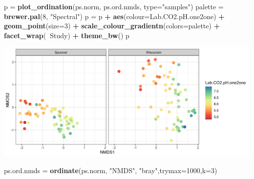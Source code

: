 \documentclass[]{article}
\newenvironment{Shaded}{\begin{snugshade}}{\end{snugshade}}
\newcommand{\DataTypeTok}[1]{\textcolor[rgb]{0.13,0.29,0.53}{#1}}
\newcommand{\DecValTok}[1]{\textcolor[rgb]{0.00,0.00,0.81}{#1}}
\newcommand{\KeywordTok}[1]{\textcolor[rgb]{0.13,0.29,0.53}{\textbf{#1}}}
\newcommand{\NormalTok}[1]{#1}
\newcommand{\OperatorTok}[1]{\textcolor[rgb]{0.81,0.36,0.00}{\textbf{#1}}}
\newcommand{\StringTok}[1]{\textcolor[rgb]{0.31,0.60,0.02}{#1}}
\begin{document}
\begin{Shaded}
\begin{Highlighting}[]
\NormalTok{p =}\StringTok{ }\KeywordTok{plot_ordination}\NormalTok{(ps.norm, ps.ord.nmds, }\DataTypeTok{type=}\StringTok{"samples"}\NormalTok{)}
\NormalTok{palette =}\StringTok{ }\KeywordTok{brewer.pal}\NormalTok{(}\DecValTok{8}\NormalTok{, }\StringTok{"Spectral"}\NormalTok{)}
\NormalTok{p =}\StringTok{ }\NormalTok{p }\OperatorTok{+}\StringTok{ }\KeywordTok{aes}\NormalTok{(}\DataTypeTok{colour=}\NormalTok{Lab.CO2.pH.one2one) }\OperatorTok{+}\StringTok{ }\KeywordTok{geom_point}\NormalTok{(}\DataTypeTok{size=}\DecValTok{3}\NormalTok{) }\OperatorTok{+}\StringTok{ }
\StringTok{  }\KeywordTok{scale_colour_gradientn}\NormalTok{(}\DataTypeTok{colors=}\NormalTok{palette) }\OperatorTok{+}\StringTok{ }\KeywordTok{facet_wrap}\NormalTok{(}\OperatorTok{~}\NormalTok{Study) }\OperatorTok{+}\StringTok{ }
\StringTok{  }\KeywordTok{theme_bw}\NormalTok{()}
\NormalTok{p}
\end{Highlighting}
\end{Shaded}

\includegraphics{output-rmd/nmds-bray-soilph-Lab.CO2.pH.one2one-1.png}

\begin{Shaded}
\begin{Highlighting}[]
\NormalTok{ps.ord.nmds =}\StringTok{ }\KeywordTok{ordinate}\NormalTok{(ps.norm, }\StringTok{"NMDS"}\NormalTok{, }\StringTok{"bray"}\NormalTok{,}\DataTypeTok{trymax=}\DecValTok{1000}\NormalTok{,}\DataTypeTok{k=}\DecValTok{3}\NormalTok{)}
\end{Highlighting}
\end{Shaded}
\end{document}
